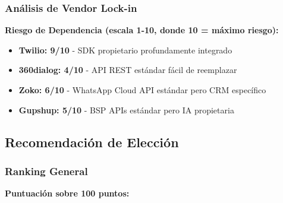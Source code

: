 \documentclass{article}
\begin{document}
\subsubsection{Análisis de Vendor Lock-in}

\textbf{Riesgo de Dependencia (escala 1-10, donde 10 = máximo riesgo):}

\begin{itemize}
    \item \textcolor{errorred}{\textbf{Twilio: 9/10}} - SDK propietario profundamente integrado
    \item \textcolor{warningorange}{\textbf{360dialog: 4/10}} - API REST estándar fácil de reemplazar  
    \item \textcolor{warningorange}{\textbf{Zoko: 6/10}} - WhatsApp Cloud API estándar pero CRM específico
    \item \textcolor{warningorange}{\textbf{Gupshup: 5/10}} - BSP APIs estándar pero IA propietaria
\end{itemize}

\subsection{Recomendación de Elección}

\subsubsection{Ranking General}

\textbf{Puntuación sobre 100 puntos:}
\end{document}
